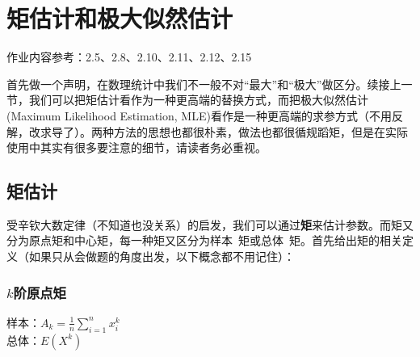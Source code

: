 \documentclass[10pt, a4paper]{article}
\begin{document}
\section{矩估计和极大似然估计}
作业内容参考：2.5、2.8、2.10、2.11、2.12、2.15\par
首先做一个声明，在数理统计中我们不一般不对“最大”和“极大”做区分。续接上一节，我们可以把矩估计看作为一种更高端的替换方式，而把极大似然估计(Maximum Likelihood Estimation, MLE)看作是一种更高端的求参方式（不用反解，改求导了）。两种方法的思想也都很朴素，做法也都很循规蹈矩，但是在实际使用中其实有很多要注意的细节，请读者务必重视。
\subsection{矩估计}
受辛钦大数定律（不知道也没关系）的启发，我们可以通过\textbf{矩}来估计参数。而矩又分为原点矩和中心矩，每一种矩又区分为样本~矩或总体~矩。首先给出矩的相关定义（如果只从会做题的角度出发，以下概念都不用记住）：

\subsubsection*{$k$阶原点矩}
\begin{center}
样本：$A_k=\frac{1}{n}\sum_{i=1}^{n}x^k_i$ \\
总体：$E(X^k)$
\end{center}
\end{document}
